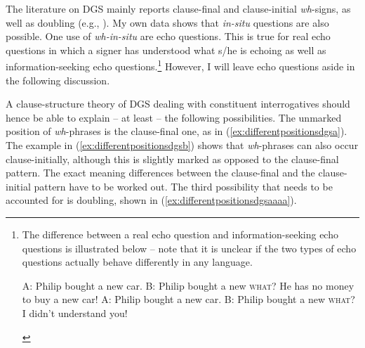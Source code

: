 The literature on DGS mainly reports clause-final and clause-initial \textit{wh}-signs, as well as doubling (e.g., \citealt{papaspyrou2008grammatik, happ2014vork}). My own data shows that \textit{in-situ} questions are also possible. One use of \textit{wh-in-situ} are echo questions. This is true for real echo questions in which a signer has understood what s/he is echoing as well as information-seeking echo questions.\footnote{The difference between a real echo question and information-seeking echo questions is illustrated below -- note that it is unclear if the two types of echo questions actually behave differently in any language.

\begin{exe}
\ex\label{echoquestionillustrationenglish}\begin{xlist}
\ex A: Philip bought a new car.
\glt B: Philip bought a new \textsc{what}? He has no money to buy a new car! \label{echoquestionillustrationenglishb}
\ex A: Philip bought a new car.
\glt B: Philip bought a new \textsc{what}? I didn't understand you! \label{echoquestionillustrationenglisha}

\end{xlist}
\end{exe}

} However, I will leave echo questions aside in the following discussion.

A clause-structure theory of DGS dealing with constituent interrogatives should hence be able to explain -- at least -- the following possibilities. The unmarked position of \textit{wh}-phrases is the clause-final one, as in (\ref{ex:differentpositionsdgsa}). The example in (\ref{ex:differentpositionsdgsb}) shows that \textit{wh}-phrases can also occur clause-initially, although this is slightly marked as opposed to the clause-final pattern. The exact meaning differences between the clause-final and the clause-initial pattern have to be worked out. The third possibility that needs to be accounted for is doubling, shown in (\ref{ex:differentpositionsdgsaaaa}). 

